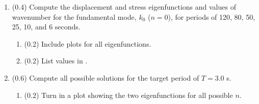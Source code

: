\documentclass[11pt,titlepage,fleqn]{article}
\newcommand{\tfilemainB}{{\tt hw\_modesB.ipynb}}
\newcommand{\tfilessB}{{\tt surf\_stress\_love.py}}
\begin{document}
\begin{enumerate}
\begin{enumerate}
\begin{itemize}
\item If the eigenfunctions appear jagged, then adjust \maxstep\ to improve their accuracy.

\item Suggestion: For plotting purposes only, you may find it simpler to transform your $r$~values into depth values, with $z=0$ at the surface. You can then use \\ \verb+plt.invert_yaxis()+ to flip the direction of the $y$-axis.
\end{itemize}

\item (0.0) What is the normalized value of stress at the surface, $T(r_a)\,/\max(|T(r)|)$?

\item (1.0) Check the system of equations () for this solution (see \tfilemainB). You should get much better agreement if you lower the tolerance levels for \sfind\ by changing \maxstep\ (in \tfilemainB).

Show your code and output to demonstrate your findings.
(Do not show the already-provided code \tfilessB.)

\item (0.0) What is the normalized value of stress at the surface, $T(r_a)\,/\max(|T(r)|)$?

After you do the check, you can go back to using the default tolerance.
\end{enumerate}


\item (0.4) Compute the displacement and stress eigenfunctions and values of wavenumber for the fundamental mode, $k_0$ ($n=0$), for periods of 120, 80, 50, 25, 10, and 6 seconds.

\begin{enumerate}
\item (0.2) Include plots for all eigenfunctions.

\item (0.2) List values in .
\end{enumerate}


\item (0.6) Compute all possible solutions for the target period of $T = 3.0$ s.
%
\begin{enumerate}
\item (0.2) Turn in a plot showing the two eigenfunctions for all possible $n$.


\end{enumerate}
\end{enumerate}
\end{document}
